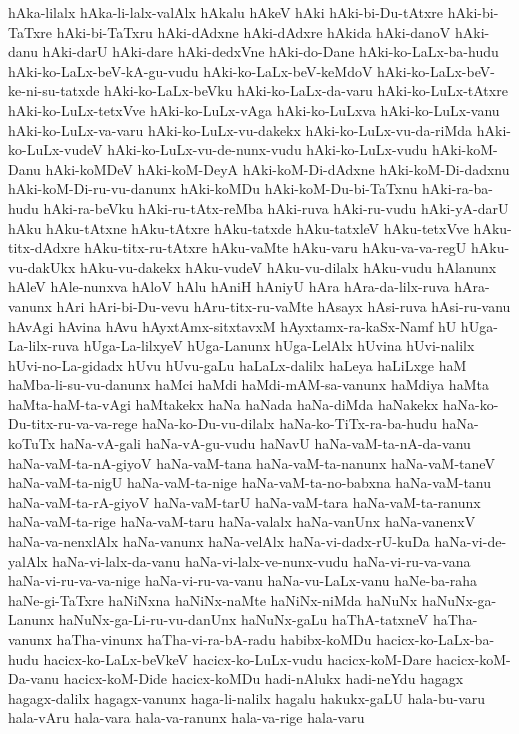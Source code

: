 {hAka-lilalx
hAka-li-lalx-valAlx
hAkalu
hAkeV
hAki
hAki-bi-Du-tAtxre
hAki-bi-TaTxre
hAki-bi-TaTxru
hAki-dAdxne
hAki-dAdxre
hAkida
hAki-danoV
hAki-danu
hAki-darU
hAki-dare
hAki-dedxVne
hAki-do-Dane
hAki-ko-LaLx-ba-hudu
hAki-ko-LaLx-beV-kA-gu-vudu
hAki-ko-LaLx-beV-keMdoV
hAki-ko-LaLx-beV-ke-ni-su-tatxde
hAki-ko-LaLx-beVku
hAki-ko-LaLx-da-varu
hAki-ko-LuLx-tAtxre
hAki-ko-LuLx-tetxVve
hAki-ko-LuLx-vAga
hAki-ko-LuLxva
hAki-ko-LuLx-vanu
hAki-ko-LuLx-va-varu
hAki-ko-LuLx-vu-dakekx
hAki-ko-LuLx-vu-da-riMda
hAki-ko-LuLx-vudeV
hAki-ko-LuLx-vu-de-nunx-vudu
hAki-ko-LuLx-vudu
hAki-koM-Danu
hAki-koMDeV
hAki-koM-DeyA
hAki-koM-Di-dAdxne
hAki-koM-Di-dadxnu
hAki-koM-Di-ru-vu-danunx
hAki-koMDu
hAki-koM-Du-bi-TaTxnu
hAki-ra-ba-hudu
hAki-ra-beVku
hAki-ru-tAtx-reMba
hAki-ruva
hAki-ru-vudu
hAki-yA-darU
hAku
hAku-tAtxne
hAku-tAtxre
hAku-tatxde
hAku-tatxleV
hAku-tetxVve
hAku-titx-dAdxre
hAku-titx-ru-tAtxre
hAku-vaMte
hAku-varu
hAku-va-va-regU
hAku-vu-dakUkx
hAku-vu-dakekx
hAku-vudeV
hAku-vu-dilalx
hAku-vudu
hAlanunx
hAleV
hAle-nunxva
hAloV
hAlu
hAniH
hAniyU
hAra
hAra-da-lilx-ruva
hAra-vanunx
hAri
hAri-bi-Du-vevu
hAru-titx-ru-vaMte
hAsayx
hAsi-ruva
hAsi-ru-vanu
hAvAgi
hAvina
hAvu
hAyxtAmx-sitxtavxM
hAyxtamx-ra-kaSx-Namf
hU
hUga-La-lilx-ruva
hUga-La-lilxyeV
hUga-Lanunx
hUga-LelAlx
hUvina
hUvi-nalilx
hUvi-no-La-gidadx
hUvu
hUvu-gaLu
haLaLx-dalilx
haLeya
haLiLxge
haM
haMba-li-su-vu-danunx
haMci
haMdi
haMdi-mAM-sa-vanunx
haMdiya
haMta
haMta-haM-ta-vAgi
haMtakekx
haNa
haNada
haNa-diMda
haNakekx
haNa-ko-Du-titx-ru-va-va-rege
haNa-ko-Du-vu-dilalx
haNa-ko-TiTx-ra-ba-hudu
haNa-koTuTx
haNa-vA-gali
haNa-vA-gu-vudu
haNavU
haNa-vaM-ta-nA-da-vanu
haNa-vaM-ta-nA-giyoV
haNa-vaM-tana
haNa-vaM-ta-nanunx
haNa-vaM-taneV
haNa-vaM-ta-nigU
haNa-vaM-ta-nige
haNa-vaM-ta-no-babxna
haNa-vaM-tanu
haNa-vaM-ta-rA-giyoV
haNa-vaM-tarU
haNa-vaM-tara
haNa-vaM-ta-ranunx
haNa-vaM-ta-rige
haNa-vaM-taru
haNa-valalx
haNa-vanUnx
haNa-vanenxV
haNa-va-nenxlAlx
haNa-vanunx
haNa-velAlx
haNa-vi-dadx-rU-kuDa
haNa-vi-de-yalAlx
haNa-vi-lalx-da-vanu
haNa-vi-lalx-ve-nunx-vudu
haNa-vi-ru-va-vana
haNa-vi-ru-va-va-nige
haNa-vi-ru-va-vanu
haNa-vu-LaLx-vanu
haNe-ba-raha
haNe-gi-TaTxre
haNiNxna
haNiNx-naMte
haNiNx-niMda
haNuNx
haNuNx-ga-Lanunx
haNuNx-ga-Li-ru-vu-danUnx
haNuNx-gaLu
haThA-tatxneV
haTha-vanunx
haTha-vinunx
haTha-vi-ra-bA-radu
habibx-koMDu
hacicx-ko-LaLx-ba-hudu
hacicx-ko-LaLx-beVkeV
hacicx-ko-LuLx-vudu
hacicx-koM-Dare
hacicx-koM-Da-vanu
hacicx-koM-Dide
hacicx-koMDu
hadi-nAlukx
hadi-neYdu
hagagx
hagagx-dalilx
hagagx-vanunx
haga-li-nalilx
hagalu
hakukx-gaLU
hala-bu-varu
hala-vAru
hala-vara
hala-va-ranunx
hala-va-rige
hala-varu
}
